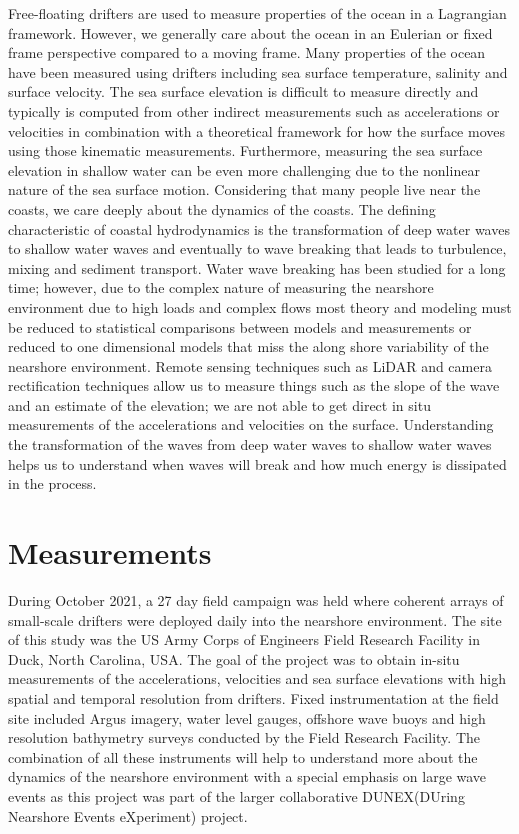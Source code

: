 \documentclass[essd, manuscript]{copernicus}
\begin{document}
\introduction  %
Free-floating drifters are used to measure properties of the ocean in a Lagrangian framework. However, we generally care about the ocean in an Eulerian or fixed frame perspective compared to a moving frame. Many properties of the ocean have been measured using drifters including sea surface temperature, salinity and surface velocity. The sea surface elevation is difficult to measure directly and typically is computed from other indirect measurements such as accelerations or velocities in combination with a theoretical framework for how the surface moves using those kinematic measurements. Furthermore, measuring the sea surface elevation in shallow water can be even more challenging due to the nonlinear nature of the sea surface motion. Considering that many people live near the coasts, we care deeply about the dynamics of the coasts. The defining characteristic of coastal hydrodynamics is the transformation of deep water waves to shallow water waves and eventually to wave breaking that leads to turbulence, mixing and sediment transport. Water wave breaking has been studied for a long time; however, due to the complex nature of measuring the nearshore environment due to high loads and complex flows most theory and modeling must be reduced to statistical comparisons between models and measurements or reduced to one dimensional models that miss the along shore variability of the nearshore environment. Remote sensing techniques such as LiDAR and camera rectification techniques allow us to measure things such as the slope of the wave and an estimate of the elevation; we are not able to get direct in situ measurements of the accelerations and velocities on the surface. Understanding the transformation of the waves from deep water waves to shallow water waves helps us to understand when waves will break and how much energy is dissipated in the process. 


\section{Measurements}
During October 2021, a 27 day field campaign was held where coherent arrays of small-scale drifters were deployed daily into the nearshore environment. The site of this study was the US Army Corps of Engineers Field Research Facility in Duck, North Carolina, USA. The goal of the project was to obtain in-situ measurements of the accelerations, velocities and sea surface elevations with high spatial and temporal resolution from drifters. Fixed instrumentation at the field site included Argus imagery, water level gauges, offshore wave buoys and high resolution bathymetry surveys conducted by the Field Research Facility. The combination of all these instruments will help to understand more about the dynamics of the nearshore environment with a special emphasis on large wave events as this project was part of the larger collaborative DUNEX(DUring Nearshore Events eXperiment) project.
\end{document}
